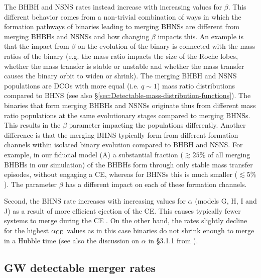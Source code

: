 \documentclass[fleqn,usenatbib]{mnras}
\begin{document}
The \ac{BHBH} and \ac{NSNS} rates instead increase with increasing values for $\beta$.  This different behavior comes from a non-trivial combination of ways in which the formation pathways of binaries leading to merging \acp{BHNS} are different from merging \acp{BHBH} and \acp{NSNS} and how changing $\beta$ impacts this.  An example is that the impact from $\beta$ on the evolution of the binary is connected with the mass ratios of the binary (e.g. the mass ratio impacts the size of the Roche lobes, whether the  mass transfer is stable or unstable and whether the mass transfer causes the binary orbit to widen or shrink). The merging \ac{BHBH} and \ac{NSNS} populations are \acp{DCO} with more equal (i.e. $q\sim1$) mass ratio distributions compared to \ac{BHNS} (see also \S\ref{sec:Detectable-mass-distribution-functions}). The binaries that form merging \acp{BHBH} and \acp{NSNS} originate thus from different mass ratio populations at the same evolutionary stages compared to merging \acp{BHNS}.  This results in the $\beta$ parameter impacting the populations differently. Another difference is that the merging \ac{BHNS} typically form from different formation channels within isolated binary evolution compared to \ac{BHBH} and \ac{NSNS}. For example, in our fiducial model (A) a substantial fraction ($\gtrsim 25\%$ of all merging \acp{BHBH} in our simulation) of the \acp{BHBH} form through only stable mass transfer episodes, without engaging a \ac{CE},  whereas for \acp{BHNS} this is much smaller ($\lesssim 5\%$).  The parameter $\beta$ has a different impact on each of these formation channels. %

Second, the \ac{BHNS} rate increases with increasing values for $\alpha$ (models G, H, I and J) as a result of more efficient ejection of the \ac{CE}. This causes typically fewer systems to merge during the \ac{CE} \citep[cf.,][Figure 17]{Kruckow:2018}.  On the other hand, the rates slightly decline for the highest $\alpha_{\rm{CE}}$ values as in this case binaries do not shrink enough to merge in a Hubble time (see also the discussion on $\alpha$ in \S3.1.1 from \citealt{Bavera:2021}).









\subsection{GW detectable merger rates}
\label{subsec:comparing-BBH-BNS-detected-rates}
\end{document}
